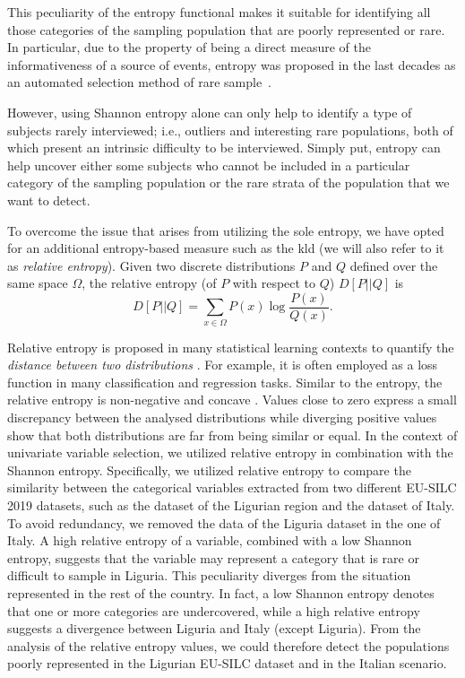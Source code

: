 This peculiarity of the entropy functional makes it suitable for identifying all those categories of the sampling population that are poorly represented or rare.
In particular, due to the property of being a direct measure of the informativeness of a source of events, entropy was proposed in the last decades as an automated selection method of rare sample~\cite{daneshpazhouh2014entropy, berezinski2015entropy}.

However, using Shannon entropy alone can only help to identify a type of subjects rarely interviewed; 
i.e., outliers and interesting rare populations, both of which present an intrinsic difficulty to be interviewed.
Simply put, entropy can help uncover either some subjects who cannot be included in a particular category of the sampling population or the rare strata of the population that we want to detect.

To overcome the issue that arises from utilizing the sole entropy, we have opted for an additional entropy-based measure such as the \gls{kld} (we will also refer to it as \emph{relative entropy}).
Given two discrete distributions $P$ and $Q$ defined over the same space $\Omega$, the relative entropy (of $P$ with respect to $Q$) $D[P||Q]$ is
\begin{equation}\label{eq: KL_divergence_discrete}
    D[P||Q] = \sum_{x\in \Omega} P(x) \log{\frac{P(x)}{Q(x)}}.
\end{equation}

Relative entropy is proposed in many statistical learning contexts to quantify the \emph{distance between two distributions} \cite[]{bishop2006pattern}. 
For example, it is often employed as a loss function in many classification and regression tasks.
Similar to the entropy, the relative entropy is non-negative and concave \cite[]{bishop2006pattern}. 
Values close to zero express a small discrepancy between the analysed distributions while diverging positive values show that both distributions are far from being similar or equal.
In the context of univariate variable selection, we utilized relative entropy in combination with the Shannon entropy.
Specifically, we utilized relative entropy to compare the similarity between the categorical variables extracted from two different EU-SILC 2019 datasets, such as the dataset of the Ligurian region and the dataset of Italy.
To avoid redundancy, we removed the data of the Liguria dataset in the one of Italy. 
A high relative entropy of a variable, combined with a low Shannon entropy, suggests that the variable may represent a category that is rare or difficult to sample in Liguria. 
This peculiarity diverges from the situation represented in the rest of the country.
In fact, a low Shannon entropy denotes that one or more categories are undercovered, while a high relative entropy suggests a divergence between Liguria and Italy (except Liguria).
From the analysis of the relative entropy values, we could therefore detect the populations poorly represented in the Ligurian EU-SILC dataset and in the Italian scenario.

